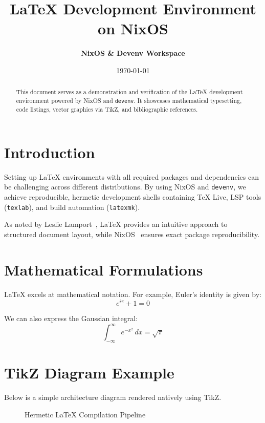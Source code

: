 \documentclass[11pt,a4paper]{article}
\title{\textbf{LaTeX Development Environment on NixOS}}
\author{\textbf{NixOS \& Devenv Workspace}}
\date{\today}
\begin{document}
\maketitle

\begin{abstract}
	This document serves as a demonstration and verification of the LaTeX development environment powered by NixOS and \texttt{devenv}. It showcases mathematical typesetting, code listings, vector graphics via TikZ, and bibliographic references.
\end{abstract}

\section{Introduction}
Setting up LaTeX environments with all required packages and dependencies can be challenging across different distributions. By using NixOS and \texttt{devenv}, we achieve reproducible, hermetic development shells containing TeX Live, LSP tools (\texttt{texlab}), and build automation (\texttt{latexmk}).

As noted by Leslie Lamport~\cite{lamport1986latex}, LaTeX provides an intuitive approach to structured document layout, while NixOS~\cite{nixos2004} ensures exact package reproducibility.

\section{Mathematical Formulations}
LaTeX excels at mathematical notation. For example, Euler's identity is given by:
\begin{equation}
	e^{i\pi} + 1 = 0
\end{equation}

We can also express the Gaussian integral:
\begin{equation}
	\int_{-\infty}^{\infty} e^{-x^2} \, dx = \sqrt{\pi}
\end{equation}

\section{TikZ Diagram Example}
Below is a simple architecture diagram rendered natively using TikZ.

\begin{figure}[htbp]
	\centering
	\caption{Hermetic LaTeX Compilation Pipeline}\label{fig:pipeline}
\end{figure}
\end{document}
